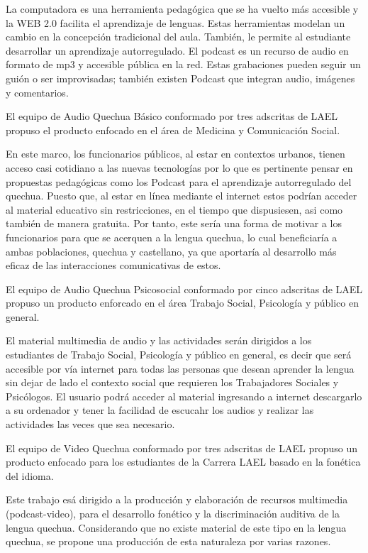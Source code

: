 La computadora es una herramienta pedag\'{o}gica que se ha vuelto m\'{a}s accesible y la WEB 2.0 facilita el aprendizaje de lenguas.
Estas herramientas modelan un cambio en la concepci\'{o}n tradicional del aula. Tambi\'{e}n, le permite al estudiante desarrollar
un aprendizaje autorregulado. El podcast es un recurso de audio en formato de mp3 y accesible p\'{u}blica en la red. Estas grabaciones
pueden seguir un gui\'{o}n o ser improvisadas; tambi\'{e}n existen Podcast que integran audio, im\'{a}genes y comentarios.\cite{AFSTVV2015}

El equipo de Audio Quechua B\'{a}sico conformado por tres adscritas de LAEL propuso el producto enfocado en el \'{a}rea de Medicina y
Comunicaci\'{o}n Social. 

En este marco, los funcionarios p\'{u}blicos, al estar en contextos urbanos, tienen acceso casi cotidiano a las nuevas tecnolog\'{i}as
por lo que es pertinente pensar en propuestas pedag\'{o}gicas como los Podcast para el aprendizaje autorregulado del quechua. Puesto que,
al estar en l\'{i}nea mediante el internet estos podr\'{i}an acceder al material educativo sin restricciones, en el tiempo que dispusiesen,
asi como tambi\'{e}n de manera gratuita. Por tanto, este ser\'{i}a una forma de motivar a los funcionarios para que se acerquen a la lengua
quechua, lo cual beneficiar\'{i}a a ambas poblaciones, quechua y castellano, ya que aportar\'{i}a al desarrollo m\'{a}s eficaz de las interacciones comunicativas de estos.\cite{CCZ2015}

El equipo de  Audio Quechua Psicosocial conformado por cinco adscritas de LAEL propuso un producto enforcado en el \'{a}rea Trabajo Social, Psicolog\'{i}a y p\'{u}blico en general.

El material multimedia de audio y las actividades ser\'{a}n dirigidos a los estudiantes de Trabajo Social, Psicolog\'{i}a y 
p\'{u}blico en general, es decir que ser\'{a} accesible por v\'{i}a internet para todas las personas que desean aprender la lengua
sin dejar de lado el contexto social que requieren los Trabajadores Sociales y Psic\'{o}logos. El usuario podr\'{a} acceder al 
material ingresando a internet descargarlo a su ordenador y tener la facilidad de escucahr los audios y realizar las actividades las
veces que sea necesario.\cite{BDFJR2015}

El equipo de Video Quechua conformado por tres adscritas de LAEL propuso un producto enfocado para los estudiantes de la Carrera
LAEL basado en la fon\'{e}tica del idioma.

Este trabajo es\'{a} dirigido a la producci\'{o}n y elaboraci\'{o}n de recursos multimedia (podcast-video), para el desarrollo fon\'{e}tico y la discriminaci\'{o}n auditiva de la lengua quechua. Considerando que no existe material de este tipo en la lengua quechua, se propone una producci\'{o}n de esta naturaleza por varias razones.\cite{CGL2015}

